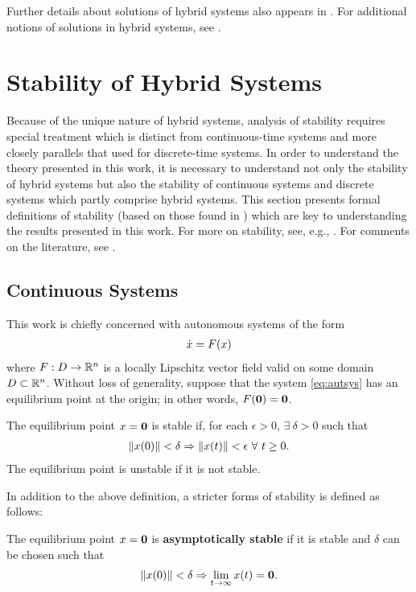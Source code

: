 Further details about solutions of hybrid systems also appears in
.
%
For additional notions of solutions in hybrid systems, see \cite{Filippov1988,
  Goebel2009, Haddad2001, Lygeros2003, Ye1998}.

\section{Stability of Hybrid Systems} \label{sec:hsys-stability}

Because of the unique nature of hybrid systems, analysis of stability requires
special treatment which is distinct from continuous-time systems and more
closely parallels that used for discrete-time systems.
%
In order to understand the theory presented in this work, it is necessary to
understand not only the stability of hybrid systems but also the stability of
continuous systems and discrete systems which partly comprise hybrid systems.
%
This section presents formal definitions of stability (based on
those found in \cite[Ch. 4]{Khalil2002}) which are key to understanding the results presented in this
work.
%
For more on stability, see, e.g., \cite{Khalil2002, Teschl2012,
  Vidyasagar1993}.
%
For comments on the literature, see .

\subsection{Continuous Systems}
This work is chiefly concerned with autonomous systems of the form
\begin{align}
  \label{eq:autsys}
  {\dot {x}} = F(x)
\end{align}
where $F : D \to \mathbb{R}^{n}$ is a locally Lipschitz vector field valid on some
domain $D \subset \mathbb{R}^{n}$.
%
Without loss of generality, suppose that the system \eqref{eq:autsys} has an
equilibrium point at the origin;
%
in other words, $F({\mathbf 0}) = {\mathbf 0}$.
%
\begin{definition}
  The equilibrium point $x = {\mathbf 0}$ is stable if, for each $\epsilon > 0$,
  $\exists \ \delta > 0$ such that
  \begin{align*}
    \|x(0)\| < \delta \Rightarrow \|x(t)\| < \epsilon \ \forall \ t
    \geq 0.
  \end{align*}
  The equilibrium point is unstable if it is not stable.
\end{definition}

In addition to the above definition, a stricter forms of stability is defined as
follows:
%
\begin{definition}
  The equilibrium point $x = {\mathbf 0}$ is {\bf asymptotically stable} if it is
  stable and $\delta$ can be chosen such that
  \begin{align*}
    \|x(0)\| < \delta \Rightarrow \lim_{t \to \infty} x(t) = {\mathbf 0}.
  \end{align*}
\end{definition}

